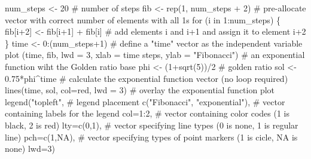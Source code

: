 \documentclass[
  letterpaper,
  DIV=11,
  numbers=noendperiod]{scrreprt}
\newenvironment{Shaded}{\begin{snugshade}}{\end{snugshade}}
\newcommand{\AttributeTok}[1]{\textcolor[rgb]{0.40,0.45,0.13}{#1}}
\newcommand{\CommentTok}[1]{\textcolor[rgb]{0.37,0.37,0.37}{#1}}
\newcommand{\ConstantTok}[1]{\textcolor[rgb]{0.56,0.35,0.01}{#1}}
\newcommand{\ControlFlowTok}[1]{\textcolor[rgb]{0.00,0.23,0.31}{#1}}
\newcommand{\DecValTok}[1]{\textcolor[rgb]{0.68,0.00,0.00}{#1}}
\newcommand{\FloatTok}[1]{\textcolor[rgb]{0.68,0.00,0.00}{#1}}
\newcommand{\FunctionTok}[1]{\textcolor[rgb]{0.28,0.35,0.67}{#1}}
\newcommand{\NormalTok}[1]{\textcolor[rgb]{0.00,0.23,0.31}{#1}}
\newcommand{\OtherTok}[1]{\textcolor[rgb]{0.00,0.23,0.31}{#1}}
\newcommand{\SpecialCharTok}[1]{\textcolor[rgb]{0.37,0.37,0.37}{#1}}
\newcommand{\StringTok}[1]{\textcolor[rgb]{0.13,0.47,0.30}{#1}}
\begin{document}
\begin{Shaded}
\begin{Highlighting}[]
\NormalTok{num\_steps }\OtherTok{\textless{}{-}} \DecValTok{20} \CommentTok{\# number of steps}
\NormalTok{fib }\OtherTok{\textless{}{-}} \FunctionTok{rep}\NormalTok{(}\DecValTok{1}\NormalTok{, num\_steps }\SpecialCharTok{+} \DecValTok{2}\NormalTok{) }\CommentTok{\# pre{-}allocate vector with correct number of elements with all 1s}
\ControlFlowTok{for}\NormalTok{ (i }\ControlFlowTok{in} \DecValTok{1}\SpecialCharTok{:}\NormalTok{num\_steps) \{}
\NormalTok{  fib[i}\SpecialCharTok{+}\DecValTok{2}\NormalTok{] }\OtherTok{\textless{}{-}}\NormalTok{ fib[i}\SpecialCharTok{+}\DecValTok{1}\NormalTok{] }\SpecialCharTok{+}\NormalTok{ fib[i] }\CommentTok{\# add elements i and i+1 and assign it to element i+2}
\NormalTok{\}}
\NormalTok{time }\OtherTok{\textless{}{-}} \DecValTok{0}\SpecialCharTok{:}\NormalTok{(num\_steps}\SpecialCharTok{+}\DecValTok{1}\NormalTok{) }\CommentTok{\# define a "time" vector as the independent variable}
\FunctionTok{plot}\NormalTok{ (time, fib, }\AttributeTok{lwd =} \DecValTok{3}\NormalTok{, }\AttributeTok{xlab =} \StringTok{\textquotesingle{}time steps\textquotesingle{}}\NormalTok{, }\AttributeTok{ylab =} \StringTok{"Fibonacci"}\NormalTok{)}
\CommentTok{\# an exponential function wiht the Golden ratio base}
\NormalTok{phi }\OtherTok{\textless{}{-}}\NormalTok{ (}\DecValTok{1}\SpecialCharTok{+}\FunctionTok{sqrt}\NormalTok{(}\DecValTok{5}\NormalTok{))}\SpecialCharTok{/}\DecValTok{2} \CommentTok{\# golden ratio}
\NormalTok{sol }\OtherTok{\textless{}{-}} \FloatTok{0.75}\SpecialCharTok{*}\NormalTok{phi}\SpecialCharTok{\^{}}\NormalTok{time }\CommentTok{\# calculate the exponential function vector (no loop required)}
\FunctionTok{lines}\NormalTok{(time, sol, }\AttributeTok{col=}\StringTok{\textquotesingle{}red\textquotesingle{}}\NormalTok{, }\AttributeTok{lwd =} \DecValTok{3}\NormalTok{) }\CommentTok{\# overlay the exponential function plot}
\FunctionTok{legend}\NormalTok{(}\StringTok{"topleft"}\NormalTok{, }\CommentTok{\# legend placement}
       \FunctionTok{c}\NormalTok{(}\StringTok{"Fibonacci"}\NormalTok{, }\StringTok{"exponential"}\NormalTok{), }\CommentTok{\# vector containing labels for the legend}
       \AttributeTok{col=}\DecValTok{1}\SpecialCharTok{:}\DecValTok{2}\NormalTok{, }\CommentTok{\# vector containing color codes (1 is black, 2 is red)}
       \AttributeTok{lty=}\FunctionTok{c}\NormalTok{(}\DecValTok{0}\NormalTok{,}\DecValTok{1}\NormalTok{), }\CommentTok{\# vector specifying line types (0 is none, 1 is regular line)}
       \AttributeTok{pch=}\FunctionTok{c}\NormalTok{(}\DecValTok{1}\NormalTok{,}\ConstantTok{NA}\NormalTok{), }\CommentTok{\# vector specifying types of point markers (1 is cicle, NA is none)}
       \AttributeTok{lwd=}\DecValTok{3}\NormalTok{) }
\end{Highlighting}
\end{Shaded}
\end{document}
